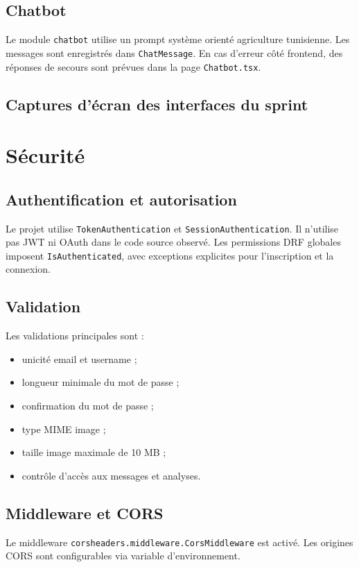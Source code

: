\subsection{Chatbot}
Le module \texttt{chatbot} utilise un prompt système orienté agriculture tunisienne. Les messages sont enregistrés dans \texttt{ChatMessage}. En cas d'erreur côté frontend, des réponses de secours sont prévues dans la page \texttt{Chatbot.tsx}.

\subsection{Captures d'écran des interfaces du sprint}


\section{Sécurité}
\subsection{Authentification et autorisation}
Le projet utilise \texttt{TokenAuthentication} et \texttt{SessionAuthentication}. Il n'utilise pas JWT ni OAuth dans le code source observé. Les permissions DRF globales imposent \texttt{IsAuthenticated}, avec exceptions explicites pour l'inscription et la connexion.

\subsection{Validation}
Les validations principales sont :
\begin{itemize}[noitemsep]
  \item unicité email et username ;
  \item longueur minimale du mot de passe ;
  \item confirmation du mot de passe ;
  \item type MIME image ;
  \item taille image maximale de 10 MB ;
  \item contrôle d'accès aux messages et analyses.
\end{itemize}

\subsection{Middleware et CORS}
Le middleware \texttt{corsheaders.middleware.CorsMiddleware} est activé. Les origines CORS sont configurables via variable d'environnement.

